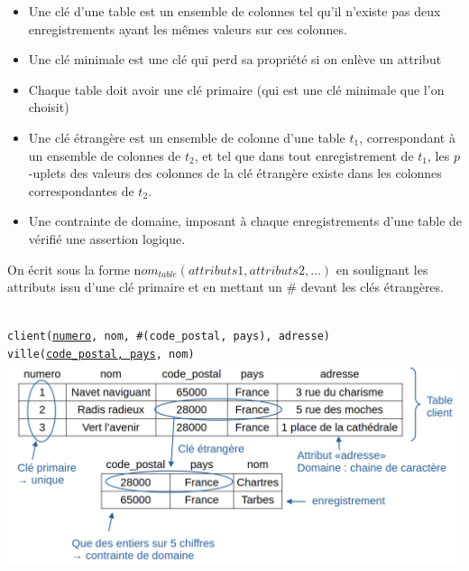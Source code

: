 \begin{definition}
	\begin{itemize}[label=$\star$]
		\item Une clé d'une table est un ensemble de colonnes tel qu'il n'existe pas deux enregistrements ayant les mêmes valeurs sur ces colonnes.
		
		\item Une clé minimale est une clé qui perd sa propriété si on enlève un attribut
		
		\item Chaque table doit avoir une clé primaire (qui est une clé minimale que l'on choisit)
		
		\item Une clé étrangère est un ensemble de colonne d'une table $t_1$, correspondant à un ensemble de colonnes de $t_2$, et tel que dans tout enregistrement de $t_1$, les $p$-uplets des valeurs des colonnes de la clé étrangère existe dans les colonnes correspondantes de $t_2$.
		
		\item Une contrainte de domaine, imposant à chaque enregistrements d'une table de vérifié une assertion logique.
	\end{itemize}
\end{definition}

\begin{personalise}[Représentation]
	On écrit sous la forme n$om_{table}(attributs1, attributs2, \dots)$ en soulignant les attributs issu d'une clé primaire et en mettant un \# devant les clés étrangères.
\end{personalise}

\begin{example}\\
	\texttt{client(\underline{numero}, nom, \#(code\_postal, pays), adresse)}\\
	\texttt{ville(\underline{code\_postal, pays}, nom)}\\
	\includegraphics[width=\linewidth]{lecon/27-relationnel-bd/exemple_table.png}
\end{example}


